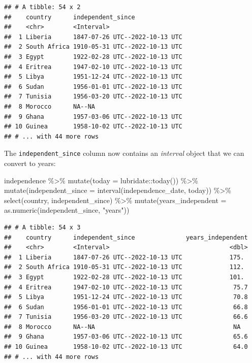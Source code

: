 \documentclass[
]{article}
\newenvironment{Shaded}{\begin{snugshade}}{\end{snugshade}}
\newcommand{\AttributeTok}[1]{\textcolor[rgb]{0.77,0.63,0.00}{#1}}
\newcommand{\FunctionTok}[1]{\textcolor[rgb]{0.00,0.00,0.00}{#1}}
\newcommand{\NormalTok}[1]{#1}
\newcommand{\SpecialCharTok}[1]{\textcolor[rgb]{0.00,0.00,0.00}{#1}}
\newcommand{\StringTok}[1]{\textcolor[rgb]{0.31,0.60,0.02}{#1}}
\begin{document}
\begin{verbatim}
## # A tibble: 54 x 2
##    country      independent_since             
##    <chr>        <Interval>                    
##  1 Liberia      1847-07-26 UTC--2022-10-13 UTC
##  2 South Africa 1910-05-31 UTC--2022-10-13 UTC
##  3 Egypt        1922-02-28 UTC--2022-10-13 UTC
##  4 Eritrea      1947-02-10 UTC--2022-10-13 UTC
##  5 Libya        1951-12-24 UTC--2022-10-13 UTC
##  6 Sudan        1956-01-01 UTC--2022-10-13 UTC
##  7 Tunisia      1956-03-20 UTC--2022-10-13 UTC
##  8 Morocco      NA--NA                        
##  9 Ghana        1957-03-06 UTC--2022-10-13 UTC
## 10 Guinea       1958-10-02 UTC--2022-10-13 UTC
## # ... with 44 more rows
\end{verbatim}

The \texttt{independent\_since} column now contains an \emph{interval} object that we can convert to years:

\begin{Shaded}
\begin{Highlighting}[]
\NormalTok{independence }\SpecialCharTok{\%\textgreater{}\%}
  \FunctionTok{mutate}\NormalTok{(}\AttributeTok{today =}\NormalTok{ lubridate}\SpecialCharTok{::}\FunctionTok{today}\NormalTok{()) }\SpecialCharTok{\%\textgreater{}\%}
  \FunctionTok{mutate}\NormalTok{(}\AttributeTok{independent\_since =} \FunctionTok{interval}\NormalTok{(independence\_date, today)) }\SpecialCharTok{\%\textgreater{}\%}
  \FunctionTok{select}\NormalTok{(country, independent\_since) }\SpecialCharTok{\%\textgreater{}\%}
  \FunctionTok{mutate}\NormalTok{(}\AttributeTok{years\_independent =} \FunctionTok{as.numeric}\NormalTok{(independent\_since, }\StringTok{"years"}\NormalTok{))}
\end{Highlighting}
\end{Shaded}

\begin{verbatim}
## # A tibble: 54 x 3
##    country      independent_since              years_independent
##    <chr>        <Interval>                                 <dbl>
##  1 Liberia      1847-07-26 UTC--2022-10-13 UTC             175. 
##  2 South Africa 1910-05-31 UTC--2022-10-13 UTC             112. 
##  3 Egypt        1922-02-28 UTC--2022-10-13 UTC             101. 
##  4 Eritrea      1947-02-10 UTC--2022-10-13 UTC              75.7
##  5 Libya        1951-12-24 UTC--2022-10-13 UTC              70.8
##  6 Sudan        1956-01-01 UTC--2022-10-13 UTC              66.8
##  7 Tunisia      1956-03-20 UTC--2022-10-13 UTC              66.6
##  8 Morocco      NA--NA                                      NA  
##  9 Ghana        1957-03-06 UTC--2022-10-13 UTC              65.6
## 10 Guinea       1958-10-02 UTC--2022-10-13 UTC              64.0
## # ... with 44 more rows
\end{verbatim}
\end{document}
